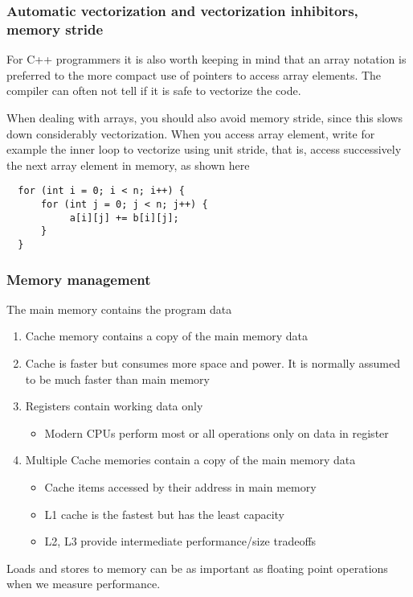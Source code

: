 \documentclass{beamer}
\begin{document}
\begin{frame}
\frametitle{Automatic vectorization and vectorization inhibitors, memory stride}

For C++ programmers  it is also worth keeping in mind that an array notation is preferred to the more compact use of pointers to access array elements. The compiler can often not tell if it is safe to vectorize the code. 

When dealing with arrays, you should also avoid memory stride, since this slows down considerably vectorization. When you access array element, write for example the inner loop to vectorize using unit stride, that is, access successively the next array element in memory, as shown here






\begin{verbatim}
  for (int i = 0; i < n; i++) {
      for (int j = 0; j < n; j++) {
           a[i][j] += b[i][j];
      }  
  }

\end{verbatim}
\end{frame}

\begin{frame}
\frametitle{Memory management}

The main memory contains the program data
\begin{enumerate}
\item Cache memory contains a copy of the main memory data

\item Cache is faster but consumes more space and power. It is normally assumed to be much faster than main memory

\item Registers contain working data only
\begin{itemize}

 \item Modern CPUs perform most or all operations only on data in register

\end{itemize}

\noindent
\item Multiple Cache memories contain a copy of the main memory data
\begin{itemize}

 \item Cache items accessed by their address in main memory

 \item L1 cache is the fastest but has the least capacity

 \item L2, L3 provide intermediate performance/size tradeoffs
\end{itemize}

\noindent
\end{enumerate}

\noindent
Loads and stores to memory can be as important as floating point operations when we measure performance.
\end{frame}
\end{document}
